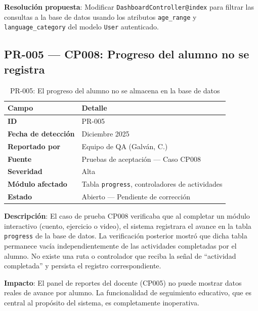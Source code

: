 \documentclass[12pt]{article}
\begin{document}
\begin{sloppypar}
\textbf{Resolución propuesta}: Modificar \texttt{DashboardController@index} para
filtrar las consultas a la base de datos usando los atributos \texttt{age\_range} y
\texttt{language\_category} del modelo \texttt{User} autenticado.
\end{sloppypar}

\newpage

\subsection[PR-005: Progreso del alumno (CP008)]{PR-005 --- CP008: Progreso del alumno no se registra}

\begin{table}[H]
\centering
\begin{tabularx}{\textwidth}{lX}
\toprule
\textbf{Campo}             & \textbf{Detalle} \\
\midrule
\textbf{ID}                & PR-005 \\
\textbf{Fecha de detección}& Diciembre 2025 \\
\textbf{Reportado por}     & Equipo de QA (Galván, C.) \\
\textbf{Fuente}            & Pruebas de aceptación --- Caso CP008 \\
\textbf{Severidad}         & Alta \\
\textbf{Módulo afectado}   & Tabla \texttt{progress}, controladores de actividades \\
\textbf{Estado}            & Abierto --- Pendiente de corrección \\
\bottomrule
\end{tabularx}
\caption{PR-005: El progreso del alumno no se almacena en la base de datos}
\end{table}

\textbf{Descripción}: El caso de prueba CP008 verificaba que al completar un módulo
interactivo (cuento, ejercicio o video), el sistema registrara el avance en la tabla
\texttt{progress} de la base de datos. La verificación posterior mostró que dicha
tabla permanece vacía independientemente de las actividades completadas por el alumno.
No existe una ruta o controlador que reciba la señal de ``actividad completada'' y
persista el registro correspondiente.

\textbf{Impacto}: El panel de reportes del docente (CP005) no puede mostrar datos
reales de avance por alumno. La funcionalidad de seguimiento educativo, que es central
al propósito del sistema, es completamente inoperativa.
\end{document}
